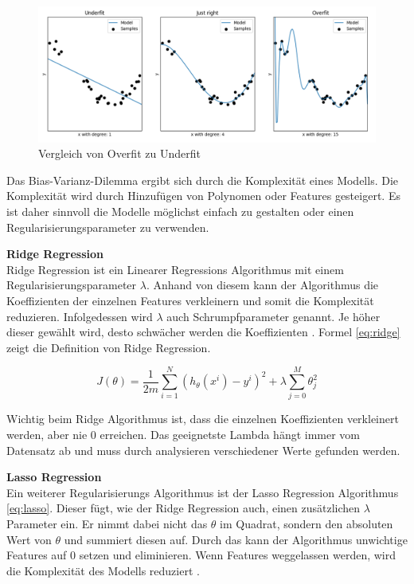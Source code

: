 \begin{figure}[ht]
\centering
\includegraphics[width=\textwidth]{images/overfit_underfit.png}
\caption[Vergleich von Overfit zu Underfit]{Vergleich von Overfit zu Underfit}
\label{fig:under_overfit}
\end{figure}

Das Bias-Varianz-Dilemma ergibt sich durch die Komplexität eines Modells. Die Komplexität wird durch Hinzufügen von Polynomen oder Features gesteigert.
Es ist daher sinnvoll die Modelle möglichst einfach zu gestalten oder einen Regularisierungsparameter zu verwenden.

\textbf{Ridge Regression}\\
Ridge Regression ist ein Linearer Regressions Algorithmus mit einem Regularisierungsparameter $\lambda$. Anhand von diesem kann der Algorithmus die Koeffizienten der einzelnen Features verkleinern und somit die Komplexität reduzieren. Infolgedessen wird $\lambda$ auch Schrumpfparameter genannt. Je höher dieser gewählt wird, desto schwächer werden die Koeffizienten \cite{ridge, ridge_2}. Formel \eqref{eq:ridge} zeigt die Definition von Ridge Regression.

\begin{equation}
\label{eq:ridge}
J(\theta) = \frac{1}{2m} \sum_{i=1}^{N} (h_\theta(x^i) - y^i)^2 + \lambda \sum_{j=0}^{M} \theta_{j}^{2}
\end{equation}

Wichtig beim Ridge Algorithmus ist, dass die einzelnen Koeffizienten verkleinert werden, aber nie 0 erreichen. Das geeignetste Lambda hängt immer vom Datensatz ab und muss durch analysieren verschiedener Werte gefunden werden.

\textbf{Lasso Regression}\\
Ein weiterer Regularisierungs Algorithmus ist der Lasso Regression Algorithmus \eqref{eq:lasso}. Dieser fügt, wie der Ridge Regression auch, einen zusätzlichen $\lambda$ Parameter ein. Er nimmt dabei nicht das $\theta$ im Quadrat, sondern den absoluten Wert von $\theta$ und summiert diesen auf. Durch das kann der Algorithmus unwichtige Features auf 0 setzen und eliminieren. Wenn Features weggelassen werden, wird die Komplexität des Modells reduziert \cite{lasso}.

